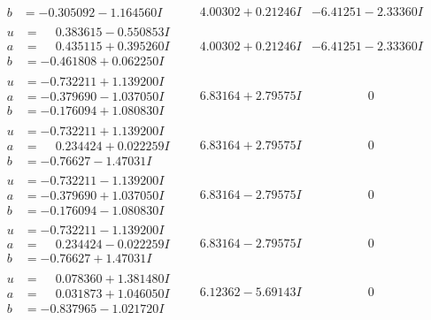 \documentclass[1p]{elsarticle_modified}
\theoremstyle{definition}
\begin{document}
$$\begin{array}{c|c|c}
\begin{aligned}
b &= -0.305092 - 1.164560 I\end{aligned}
 & \phantom{-}4.00302 + 0.21246 I & -6.41251 - 2.33360 I \\ \hline\begin{aligned}
u &= \phantom{-}0.383615 - 0.550853 I \\
a &= \phantom{-}0.435115 + 0.395260 I \\
b &= -0.461808 + 0.062250 I\end{aligned}
 & \phantom{-}4.00302 + 0.21246 I & -6.41251 - 2.33360 I \\ \hline\begin{aligned}
u &= -0.732211 + 1.139200 I \\
a &= -0.379690 - 1.037050 I \\
b &= -0.176094 + 1.080830 I\end{aligned}
 & \phantom{-}6.83164 + 2.79575 I & \phantom{-0.000000 } 0 \\ \hline\begin{aligned}
u &= -0.732211 + 1.139200 I \\
a &= \phantom{-}0.234424 + 0.022259 I \\
b &= -0.76627 - 1.47031 I\end{aligned}
 & \phantom{-}6.83164 + 2.79575 I & \phantom{-0.000000 } 0 \\ \hline\begin{aligned}
u &= -0.732211 - 1.139200 I \\
a &= -0.379690 + 1.037050 I \\
b &= -0.176094 - 1.080830 I\end{aligned}
 & \phantom{-}6.83164 - 2.79575 I & \phantom{-0.000000 } 0 \\ \hline\begin{aligned}
u &= -0.732211 - 1.139200 I \\
a &= \phantom{-}0.234424 - 0.022259 I \\
b &= -0.76627 + 1.47031 I\end{aligned}
 & \phantom{-}6.83164 - 2.79575 I & \phantom{-0.000000 } 0 \\ \hline\begin{aligned}
u &= \phantom{-}0.078360 + 1.381480 I \\
a &= \phantom{-}0.031873 + 1.046050 I \\
b &= -0.837965 - 1.021720 I\end{aligned}
 & \phantom{-}6.12362 - 5.69143 I & \phantom{-0.000000 } 0 \\ \hline\begin{aligned}

\end{aligned}
\end{array}$$
\end{document}
